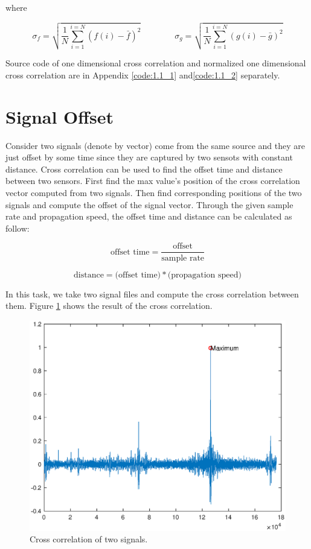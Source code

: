 where

\begin{equation*}
{\sigma _{f}}=
\sqrt{\frac{1}{N}\sum_{i=1}^{i=N}(f(i)-\bar{f})^{2}}
\hspace{4em}
{\sigma _{g}}=
\sqrt{\frac{1}{N}\sum_{i=1}^{i=N}(g(i)-\bar{g})^{2}}
\end{equation*}

Source code of one dimensional cross correlation and normalized one dimensional cross correlation are in Appendix \ref{code:1.1_1} and\ref{code:1.1_2} separately.


\section{Signal Offset}

Consider two signals (denote by vector) come from the same source and they are just offset by some time since they are captured by two sensots with constant distance. Cross correlation can be used to find the offset time and distance between two sensors. First find the max value's position of the cross correlation vector computed from two signals. Then find corresponding positions of the two signals and compute the offset of the signal vector. Through the given sample rate and propagation speed, the offset time and distance can be calculated as follow:

\begin{equation*}
\text{offset time}=\frac{\text{offset}}{\text{sample rate}} 
\end{equation*}

\begin{equation*}
\text{distance}=\text{(offset time)} * \text{(propagation speed)}
\end{equation*}

In this task, we take two signal files and compute the cross correlation between them. Figure \ref{fig:crr_vis0} shows the result of the cross correlation. 

\begin{figure}[h!]
	\centering
		\includegraphics[width=0.45\linewidth]{figures/part1/crr_vis0.eps}
		\caption{Cross correlation of two signals.}
		\label{fig:crr_vis0}
\end{figure} 

